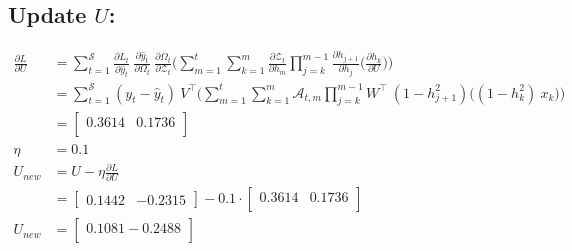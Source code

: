 \documentclass{article}
\begin{document}
\subsection{Update $U$:}
\begin{align*}
\frac{\partial L}{ \partial{U}} &= \sum_{t=1}^{\mathcal{S}}
\frac{\partial L_t}{\partial \hat{y}_t}~\frac{\partial \hat{y}_t}{\partial \Omega_t}~\frac{\partial \Omega_t}{ \partial \mathcal{Z}_t} \biggl( 
\sum_{m=1}^{t}
\sum_{k=1}^{m} \frac{\partial \mathcal{Z}_t}{ \partial h_m} 
\prod_{j=k}^{m-1} \frac{\partial h_{j+1}}{ \partial h_j} 
\biggl( \frac{\partial h_k}{ \partial U} \biggl) \biggl) \\
  &= 
\sum_{t=1}^{\mathcal{S}}
(y_t - \hat{y}_t)~V^\top \biggl( 
\sum_{m=1}^{t}
\sum_{k=1}^{m} \mathcal{A}_{t,m} 
\prod_{j=k}^{m-1} W^\top ~ (1 - h_{j+1}^2)
\biggl( (1-h_k^2)~ x_{k} \biggl) \biggl) \\
    &= \begin{bmatrix}
0.3614 & 0.1736 \\
\end{bmatrix}\\
\eta &= 0.1\\
U_{new} &= U - \eta \frac{\partial L}{\partial U}\\
&=\begin{bmatrix}
    0.1442 & -0.2315
\end{bmatrix} - 0.1 \cdot \begin{bmatrix}
0.3614 & 0.1736 \\
\end{bmatrix}\\
U_{new} &= \begin{bmatrix}
0.1081 -0.2488 \\
\end{bmatrix}
\end{align*}
\end{document}
